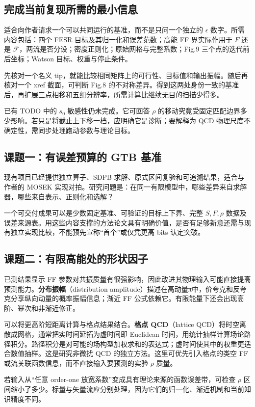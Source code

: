 \documentclass[UTF8,a4paper,11pt,fontset=fandol]{ctexart}
\numberwithin{equation}{section}
\newcommand{\Fcal}{\mathcal F}
\begin{document}
\subsection{完成当前复现所需的最小信息}
适合向作者请求一个可以共同运行的基准，而不是只问一个独立的 \(\epsilon\) 数字。所需内容包括：四个 FESR 目标及其归一化和误差范数；高能 FF 界实际作用于 \(F\) 还是 \(\Fcal\)，两流是否分设；密度正则化；原始网格与完整系数；Fig.9 三个点的迭代前后坐标；Watson 目标、权重与停止条件。

先核对一个名义 tip，就能比较相同矩阵上的可行性、目标值和输出振幅。随后再核对一个 xref 截面，可判断 Fig.8 的不对称差异。得到这两处身份一致的基准后，再扩展三点相移和五组分辨率，所需计算比继续无目的扫描少得多。

已有 TODO 中的 \(s_0\) 敏感性仍未完成。它可回答 \(\rho\) 的移动究竟受固定匹配边界多少影响。若只是将截止上下移一档，应明确它是诊断；要解释为 QCD 物理尺度不确定性，需同步处理跑动参数与理论目标。

\subsection{课题一：有误差预算的 GTB 基准}
现有项目已经提供独立算子、SDPB 求解、原式区间复验和可追溯结果，适合与作者的 MOSEK 实现对拍。研究问题是：在同一有限模型中，哪些差异来自求解器，哪些来自表示、正则化和选解？

一个可交付成果可以是少数固定基准、可验证的目标上下界、完整 \(S,F,\rho\) 数据及误差来源表。用这些内容支撑的方法论文具有明确价值，是否有足够新意还需与现有独立实现比较，不能预先宣称“首个”或仅凭更高 bits 认定突破。

\subsection{课题二：有限高能处的形状因子}
已测结果显示 FF 参数对共振质量有很强影响，因此改进其物理输入可能直接提高预测能力。\textbf{分布振幅}（distribution amplitude）描述在高动量π中，价夸克和反夸克分享纵向动量的概率振幅信息；渐近 FF 公式依赖它。有限能量下还会出现高阶、幂次和非渐近修正。

可以将更高阶短距离计算与格点结果结合。\textbf{格点 QCD}（lattice QCD）将时空离散成网格，通常把实时间延拓为虚时间即 Euclidean 时间，用统计抽样计算场论路径积分。路径积分是对可能的场构型加权求和的表达式；虚时间使其中的权重更适合数值抽样。这是研究非微扰 QCD 的独立方法。这里可优先引入格点的类空 FF 或流关联函数信息，而不直接输入要预测的实验 \(\rho\) 质量。

若输入从“任意 order-one 放宽系数”变成具有理论来源的函数误差带，可检查 \(\rho\) 区间缩小了多少。标量与矢量流应分别处理，因为它们的归一化、渐近机制和当前知识精度不同。
\end{document}
